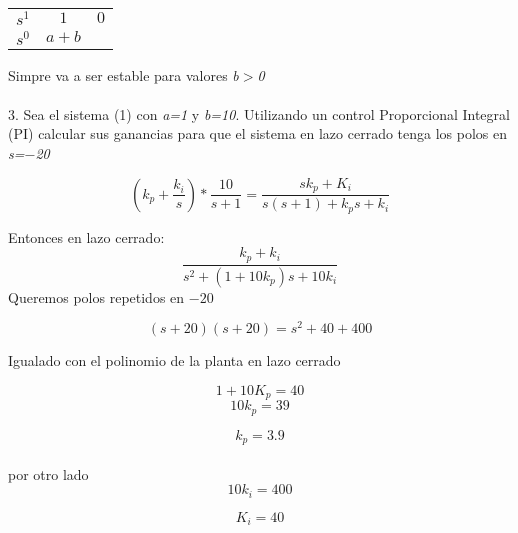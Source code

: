 \documentclass[11pt]{article}
\begin{document}
		\begin{table}[htbp]
	\centering
	\begin{tabular}{c|c c}
	$s^1$ & $1$ & $0$\\
	$s^0$ & $a+b$ &  \\
	\end{tabular}
	\end{table} 
Simpre va a ser estable para valores \emph{b$>$0}
\\
\\
3. Sea el sistema (1) con \emph{a=1} y \emph{b=10}. Utilizando un control Proporcional Integral (PI) calcular sus ganancias para que el sistema en lazo cerrado tenga los polos en \emph{s=$-$20} 

	\begin{equation}
	 	(k_p  + \frac{k_i}{s}) * \frac{10}{s+1}= \frac{s k_p + K_i}{s(s+1)+k_p s + k_i} 
	\end{equation}

 Entonces en lazo cerrado:
 \begin{equation}
    \frac{ k_p + k_i }{ s^2 + ( 1 + 10 k_p )s + 10 k_i } 	
\end{equation}
Queremos polos repetidos en $-20$

		\begin{equation}
			(s + 20)(s + 20)= s^2 + 40 + 400
		\end{equation}

		Igualado con el polinomio de la planta en lazo cerrado

\begin{equation}
 			1 + 10 K_p = 40
\end{equation}
		\begin{equation}
			10 k_p = 39 
		\end{equation}
				
		\begin{equation}
			k_p = 3.9 
\end{equation}
 \\ por otro lado
\begin{equation}
	10 k_i = 400
\end{equation} 

\begin{equation}
		K_i = 40
\end{equation}
\end{document}
